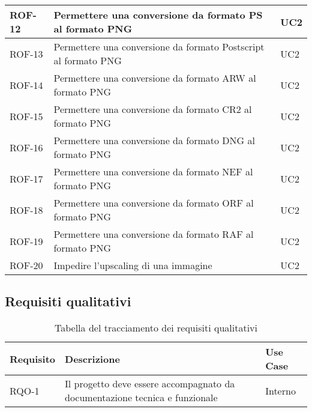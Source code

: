 \begin{table}
\begin{tabularx}{\textwidth}{lXl}
        \\
        \hline
        ROF-12             & Permettere una conversione da formato PS al formato PNG         & UC2
        \\
        \hline
        ROF-13             & Permettere una conversione da formato Postscript al formato PNG
                           & UC2
        \\
        \hline
        ROF-14             & Permettere una conversione da formato ARW al formato PNG        & UC2
        \\
        \hline
        ROF-15             & Permettere una conversione da formato CR2 al formato PNG        & UC2
        \\
        \hline
        ROF-16             & Permettere una conversione da formato DNG al formato PNG        & UC2
        \\
        \hline
        ROF-17             & Permettere una conversione da formato NEF al formato PNG        & UC2
        \\
        \hline
        ROF-18             & Permettere una conversione da formato ORF al formato PNG        & UC2
        \\
        \hline
        ROF-19             & Permettere una conversione da formato RAF al formato PNG        & UC2
        \\
        \hline
        ROF-20             & Impedire l'upscaling di una immagine                            & UC2
        \hline
    \end{tabularx}
\end{table}%

\subsection{Requisiti qualitativi}
\begin{table}%
    \caption{Tabella del tracciamento dei requisiti qualitativi}
    \label{tab:requisiti-qualitativi}
    \begin{tabularx}{\textwidth}{lXl}
        \hline\hline
        \textbf{Requisito}                  & \textbf{Descrizione}                    & \textbf{Use Case} \\
        \hline
        RQO-1                               & Il progetto deve essere accompagnato da
        documentazione tecnica e funzionale & Interno                                                     \\
        \hline
    \end{tabularx}
\end{table}%


